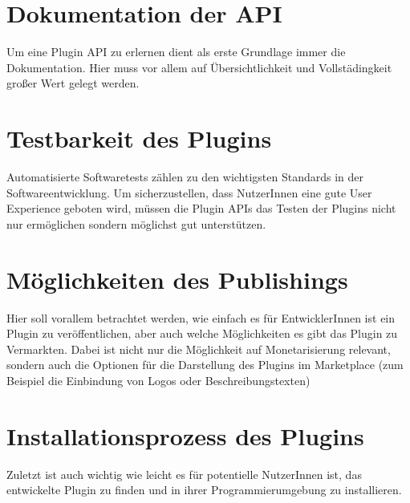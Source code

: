 \section{Dokumentation der API}
\label{sec:Kriterien_Dokumentation}

Um eine Plugin API zu erlernen dient als erste Grundlage
immer die Dokumentation. Hier muss vor allem
auf Übersichtlichkeit und Vollstädingkeit großer Wert
gelegt werden.


\section{Testbarkeit des Plugins}
\label{sec:Kriterien_Testbarkeit}

Automatisierte Softwaretests zählen zu den wichtigsten
Standards in der Softwareentwicklung.
Um sicherzustellen, dass NutzerInnen eine gute User Experience
geboten wird, müssen die Plugin APIs das Testen der
Plugins nicht nur ermöglichen sondern möglichst
gut unterstützen.


\section{Möglichkeiten des Publishings}
\label{sec:Kriterien_Publishing}

Hier soll vorallem betrachtet werden, wie
einfach es für EntwicklerInnen ist ein Plugin zu 
veröffentlichen, aber auch welche Möglichkeiten es gibt 
das Plugin zu Vermarkten. Dabei ist nicht nur die Möglichkeit
auf Monetarisierung relevant, sondern auch die
Optionen für die Darstellung des Plugins im Marketplace 
(zum Beispiel die Einbindung von Logos oder Beschreibungstexten)


\section{Installationsprozess des Plugins}
\label{sec:Kriterien_Installationsprozess}

Zuletzt ist auch wichtig wie leicht es für potentielle 
NutzerInnen ist, das entwickelte Plugin zu finden und
in ihrer Programmierumgebung zu installieren.